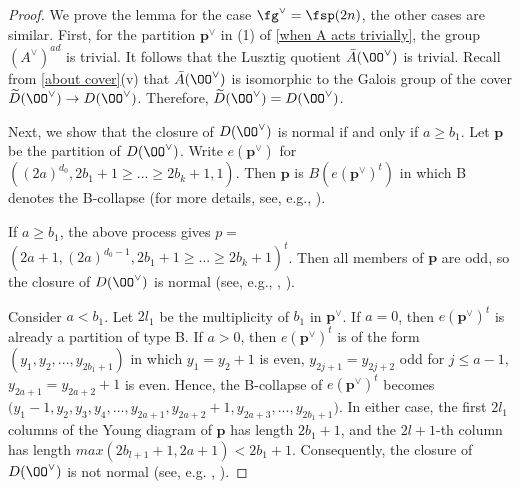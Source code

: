 \documentclass[12pt]{amsart}
\begin{document}
\begin{proof}
    We prove the lemma for the case $\fg^\vee= \fsp({2n})$, the other cases are similar. First, for the partition $\mathbf{p}^\vee$ in (1) of \cref{when A acts trivially}, the group $(A^\vee)^{ad}$ is trivial. It follows that the Lusztig quotient $\Bar{A}(\OO^\vee)$ is trivial. Recall from \cref{about cover}(v) that $\bar{A}(\OO^\vee)$ is isomorphic to the Galois group of the cover $\widetilde{D}(\OO^\vee)\rightarrow D(\OO^\vee)$. Therefore, $\widetilde{D}(\OO^\vee)= D(\OO^\vee)$. 

    Next, we show that the closure of $D(\OO^\vee)$ is normal if and only if $a\geqslant b_1$. Let $\mathbf{p}$ be the partition of $D(\OO^\vee)$. Write $e(\mathbf{p}^\vee)$ for $((2a)^{d_0}, 2b_1+1\geqslant...\geqslant 2b_k+1,1)$. Then $\mathbf{p}$ is $B(e(\mathbf{p}^\vee)^t)$ in which B denotes the B-collapse (for more details, see, e.g., \cite[Section 3.2]{LMBM}). 
    
    If $a\geqslant b_1$, the above process gives $p=$ $(2a+1, (2a)^{d_0-1}, 2b_1+1\geqslant...\geqslant 2b_k+1)^t$. Then all members of $\mathbf{p}$ are odd, so the closure of $D(\OO^\vee)$ is normal (see, e.g., \cite[Section 3]{Wong}, \cite{Kraft-Procesi}).

    Consider $a< b_1$. Let $2l_1$ be the multiplicity of $b_1$ in $\mathbf{p}^\vee$. If $a=0$, then $e(\mathbf{p}^\vee)^t$ is already a partition of type B. If $a>0$, then $e(\mathbf{p}^\vee)^t$ is of the form $(y_1,y_2,...,y_{2b_1+1})$ in which $y_1=y_2+ 1$ is even, $y_{2j+1}=y_{2j+2}$ odd for $j\leqslant a-1$, $y_{2a+1} =y_{2a+2}+ 1$ is even. Hence, the B-collapse of $e(\mathbf{p}^\vee)^t$ becomes $(y_1-1,y_2,y_3,y_4,$$...,y_{2a+1}, y_{2a+2}+1, y_{2a+3},$$...,y_{2b_1+1})$. In either case, the first $2l_1$ columns of the Young diagram of $\mathbf{p}$ has length $2b_1+1$, and the $2l+1$-th column has length $max(2b_{l+1}+1, 2a+1)< 2b_1+1$. Consequently, the closure of $D(\OO^\vee)$ is not normal (see, e.g. \cite[Theorem 3.3]{Wong}, \cite{Kraft-Procesi}). %
\end{proof}
\end{document}

